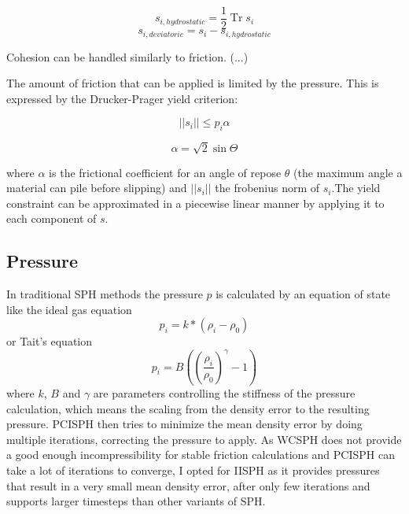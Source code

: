 \documentclass[intern]{cgMA}
\DeclareMathOperator{\Tr}{Tr}
\begin{document}
    \begin{equation}
        s_{i, hydrostatic} = \frac{1}{2} \Tr s_i 
    \end{equation}
    \begin{equation}
        s_{i, deviatoric} = s_i - s_{i, hydrostatic} 
    \end{equation}

    Cohesion can be handled similarly to friction. (...)

    The amount of friction that can be applied is limited by the pressure. This is expressed by the Drucker-Prager yield criterion:

    \begin{equation}
        ||s_i|| \leq p_i \alpha
    \end{equation}

    \begin{equation}
        \alpha = \sqrt{2} \sin \Theta
    \end{equation}

    where $\alpha$ is the frictional coefficient for an angle of repose $\theta$ (the maximum angle a material can pile before slipping) and $||s_i||$ the frobenius norm of $s_i$.The yield constraint can be approximated in a piecewise linear manner by applying it to each component of $s$. \cite{10.1145/2019406.2019410} \cite{10.2312:PE:vriphys:vriphys12:053-060} \cite{10.2312:LocalChapterEvents:CEIG:CEIG09:011-018} \cite{10.1145/1866158.1866195}

    \subsection{Pressure} \label{sec:pressure}
    In traditional SPH methods the pressure $p$ is calculated by an equation of state like the ideal gas equation \cite{wcsph}
    \begin{equation}
        p_i = k * (\rho_i - \rho_0)
    \end{equation}
    or Tait's equation \cite{wcsph}
    \begin{equation}
        p_i = B ((\frac{\rho_i}{\rho_0})^{\gamma} - 1)
    \end{equation}
    where $k$, $B$ and $\gamma$ are parameters controlling the stiffness of the pressure calculation, which means the scaling from the density error to the resulting pressure.
    PCISPH then tries to minimize the mean density error by doing multiple iterations, correcting the pressure to apply. As WCSPH does not provide a good enough incompressibility for stable friction calculations and PCISPH can take a lot of iterations to converge, I opted for IISPH as it provides pressures that result in a very small mean density error, after only few iterations and supports larger timesteps than other variants of SPH.
\end{document}
